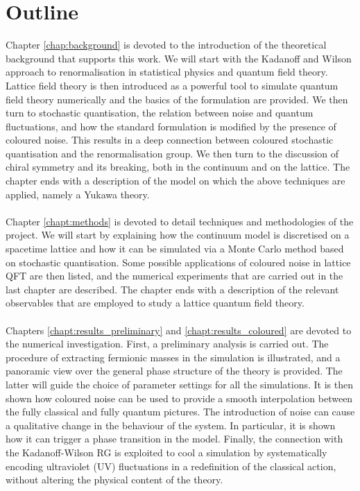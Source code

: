 \section{Outline}
Chapter \ref{chap:background} is devoted to the introduction of the theoretical background that supports this work.
We will start with the Kadanoff and Wilson approach to renormalisation in statistical physics and quantum field theory.
Lattice field theory is then introduced as a powerful tool to simulate quantum field theory numerically and the basics of the formulation are provided.     
We then turn to stochastic quantisation, the relation between noise and quantum fluctuations, and how the standard formulation is modified by the presence of coloured noise. 
This results in a deep connection between coloured stochastic quantisation and the renormalisation group. We then turn to the discussion of chiral symmetry and its breaking, both in the continuum and on the lattice.
The chapter ends with a description of the model on which the above techniques are applied, namely a Yukawa theory. \\~\\
Chapter \ref{chapt:methods} is devoted to detail techniques and methodologies of the project.
We will start by explaining how the continuum model is discretised on a spacetime lattice and how it can be simulated via a Monte Carlo method based on stochastic quantisation.
Some possible applications of coloured noise in lattice QFT are then listed, and the numerical experiments that are carried out in the last chapter are described.
The chapter ends with a description of the relevant observables that are employed to study a lattice quantum field theory. \\~\\
Chapters \ref{chapt:results_preliminary} and \ref{chapt:results_coloured} are devoted to the numerical investigation.
First, a preliminary analysis is carried out. The procedure of extracting fermionic masses in the simulation is illustrated, and a panoramic view over the general phase structure of the theory is provided. The latter will guide the choice of parameter settings for all the simulations.
It is then shown how coloured noise can be used to provide a smooth interpolation between the fully classical and fully quantum pictures.
The introduction of noise can cause a qualitative change in the behaviour of the system. In particular, it is shown how it can trigger a phase transition in the model.
Finally, the connection with the Kadanoff-Wilson RG is exploited to cool a simulation by systematically encoding ultraviolet (UV) fluctuations in a redefinition of the classical action, without altering the physical content of the theory.
